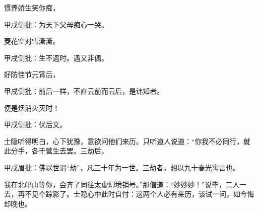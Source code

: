 \begin{poem}

    \begin{pl}
        惯养娇生笑你痴，\end{pl}\begin{note}甲戌侧批：为天下父母痴心一哭。\end{note}

    \begin{pl}
        菱花空对雪澌澌。\end{pl}\begin{note}甲戌侧批：生不遇时。遇又非偶。\end{note}

    \begin{pl}
        好防佳节元宵后，\end{pl}\begin{note}甲戌侧批：前后一样，不直云前而云后，是讳知者。\end{note}

    \begin{pl}
        便是烟消火灭时！\end{pl}\begin{note}甲戌侧批：伏后文。\end{note}
\end{poem}

\begin{parag}
    士隐听得明白，心下犹豫，意欲问他们来历。只听道人说道：“你我不必同行，就此分手，各干营生去罢。三劫后，\begin{note}甲戌眉批：佛以世谓“劫”，凡三十年为一世。三劫者，想以九十春光寓言也。\end{note}我在北邙山等你，会齐了同往太虚幻境销号。”那僧道：“妙妙妙！”说毕，二人一去，再不见个踪影了。士隐心中此时自忖：这两个人必有来历，该试一问，如今悔却晚也。
\end{parag}


